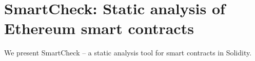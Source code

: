 
\chapter{SmartCheck: Static analysis of Ethereum smart contracts} %

\label{Chapter11_SmartCheck} %

We present SmartCheck -- a static analysis tool for smart contracts in Solidity.